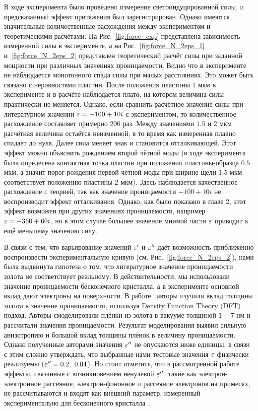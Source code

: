 В ходе эксперимента было проведено измерение светоиндуцированной силы, и предсказанный эффект притяжения был зарегистрирован. Однако имеются значительные количественные расхождения между экспериментом и теоретическими расчётами. На Рис.~\ref{fig:force_exp} представлена зависимость измеренной силы в эксперименте, а на Рис.~\ref{fig:force_N_2eps_1} и~\ref{fig:force_N_2eps_2} представлен теоретический расчёт силы при заданной мощности при различных значениях проницаемости. Видно что в эксперименте не наблюдается монотонного спада силы при малых расстояниях. Это может быть связано с неровностями пластин. После положения пластины $1$ мкм в эксперименте и в расчёте наблюдается плато, на котором величина силы практически не меняется. Однако, если сравнить расчётное значение силы при литературном значении $\varepsilon = -100+10i$ с экспериментом, то количественное расхождение составляет примерно $200$ раз.  Между значениями $1.5$ и $2$ мкм расчётная величина остаётся неизменной, в то время как измеренная плавно спадает до нуля. Далее сила меняет знак и становится отталкивающей. Этот эффект можно объяснить рождением второй чётной моды (в ходе эксперимента была определена контактная точка пластин при положении пластины-образца $0.5$ мкм, а значит порог рождения первой чётной моды при ширине щели $1.5$ мкм соответствует положению пластины $2$ мкм). Здесь наблюдается качественное расхождение с теорией, так как  значение проницаемости $-100 + 10i$ не воспроизводит эффект отталкивания. Однако, как было показано в главе 2, этот эффект возможен при других значениях проницаемости, например $\varepsilon = -360+60i$, но в этом случае большее значение мнимой части $\varepsilon$ приводит к ещё меньшему значению силу. 

В связи с тем, что варьирование значений $\varepsilon'$ и $\varepsilon''$ даёт возможность приближённо воспроизвести экспериментальную кривую (см. Рис.~\ref{fig:force_N_2eps_2}), нами была выдвинута гипотеза о том, что литературное значение проницаемости золота не соответствует реальному. В действительности, мы использовали значение проницаемости бесконечного кристалла, а в эксперименте основной вклад дают электроны на поверхности. В работе~\cite{laref2013size} авторы изучили вклад толщины золота в значение проницаемости, используя Density Function Theory (DFT) подход. Авторы смоделировали плёнки из золота в вакууме толщиной $1-7$ нм и рассчитали значения проницаемости. Результат моделирования выявил сильную анизотропию и большой вклад толщины плёнок в величину проницаемости. Однако полученные авторами значения $\varepsilon''$ не опускаются ниже единицы, в связи с этим сложно утверждать, что выбранные нами тестовые значения $\varepsilon$ физически реализуемы ($\varepsilon'' = 0.2,\ 0.04$). Но стоит отметить, что в рассмотренной работе эффекты, связанные с возникновением ненулевой $\varepsilon''$, такие как электрон-электронное рассеяние, электрон-фононное и рассеяние электронов на примесях, не рассчитываются и входят как внешний параметр, измеренный экспериментально для бесконечного кристалла~\cite{blaber2009search}.

